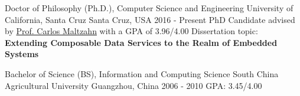 

\begin{cventries}

  \cventry
    {Doctor of Philosophy (Ph.D.), Computer Science and Engineering} %
    {University of California, Santa Cruz} %
    {Santa Cruz, USA} %
    {2016 - Present} %
    {
        PhD Candidate advised by \href{https://users.soe.ucsc.edu/~carlosm/dev/}{Prof. Carlos Maltzahn} with a GPA of 3.96/4.00 \newline
        Dissertation topic: \textbf{Extending Composable Data Services to the Realm of Embedded Systems}
    }

  \cventry
    {Bachelor of Science (BS), Information and Computing Science}
    {South China Agricultural University}
    {Guangzhou, China}
    {2006 - 2010}
    {GPA: 3.45/4.00}

\end{cventries}
